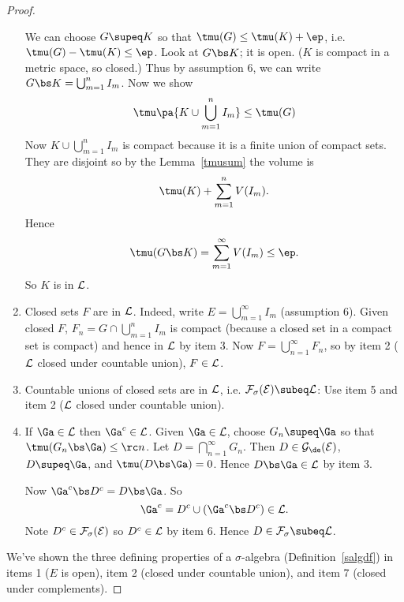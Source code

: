 \begin{proof}
\begin{enumerate}
We can choose $G\supeq K$ so that $\tmu(G)\leq \tmu(K)+\ep$, i.e. $\tmu(G)-\tmu(K)\leq \ep$.
Look at $G\bs K$; it is open. ($K$ is compact in a metric space, so closed.) Thus by assumption 6, we can write $G\bs K=\bigcup_{m=1}^n I_m$. Now we show
\[
\tmu\pa{K\cup \bigcup_{m=1}^n I_m}\leq \tmu(G)
\]
Now $K\cup \bigcup_{m=1}^n I_m$ is compact because it is a finite union of compact sets. They are disjoint so by the Lemma~\ref{tmusum}  the volume is
\[
\tmu (K)+\sum_{m=1}^n V(I_m).
\]
Hence
\[
\tmu(G\bs K)=\sum_{m=1}^{\infty} V(I_m)\leq \ep.
\]
So $K$ is in $\cal L$.
\item Closed sets $F$ are in $\cal L$.
Indeed, write $E=\bigcup_{m=1}^{\infty} I_m$ (assumption 6). 
Given closed $F$, $F_n=G\cap \bigcup_{m=1}^n I_m$ is compact (because a closed set in a compact set is compact) and hence in $\cal L$ by item 3. Now $F=\bigcup_{n=1}^{\infty} F_n$, so by item 2 ($\cal L$ closed under countable union), $F\in \cal L$.
\item Countable unions of closed sets are in $\cal L$, i.e. $\cal F_{\sigma}(E)\subeq \cal L$: Use item 5 and item 2 ($\cal L$ closed under countable union).
\item If $\Ga\in \cal L$ then $\Ga^c\in \cal L$.
Given $\Ga\in \cal L$, choose $G_n\supeq \Ga$ so that $\tmu(G_n\bs \Ga)\leq \rc n$. Let $D=\bigcap_{n=1}^{\infty} G_n$. Then $D\in \cal G_{\de}(E)$, $D\supeq \Ga$, and  $\tmu(D\bs \Ga)=0$. Hence $D\bs \Ga\in \cal L$ by item 3.

Now $\Ga^c\bs D^c=D\bs \Ga$. So
\[
\Ga^c=D^c\cup (\Ga^c\bs D^c)\in \cal L.
\]
Note $D^c\in \cal F_{\sigma}(E)$ so $D^c\in \cal L$ by item 6.
Hence $D\in \cal F_{\sigma}\subeq \cal L$.
\end{enumerate}
We've shown the three defining properties of a $\sigma$-algebra (Definition~\ref{salgdf}) in items 1 ($E$ is open), item 2 (closed under countable union), and item 7 (closed under complements).
\end{proof}



